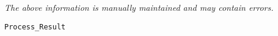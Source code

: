 \label{pkg:process\_result}

{\tiny \it The above information is manually maintained and may contain errors.}
\begin{verbatim}
Process_Result
\end{verbatim}
